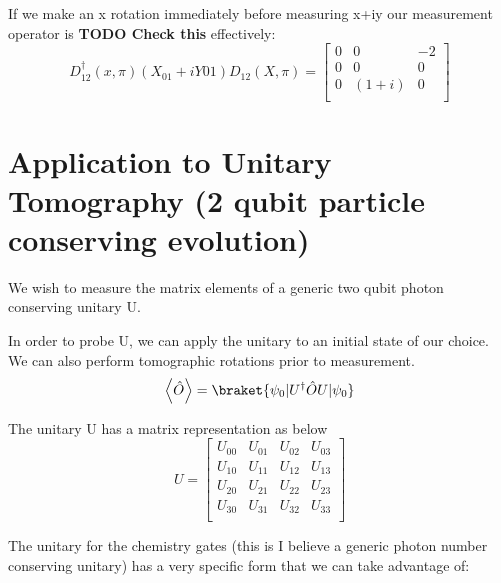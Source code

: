If we make an x rotation immediately before measuring x+iy our measurement operator is \textbf{TODO Check this} effectively:
\begin{equation}
    D_{12}^{\dagger}(x,\pi)(X_{01}+iY{01})D_{12}(X,\pi) =
    \begin{bmatrix}
        0 & 0 & -2 \\
        0 & 0 & 0 \\
        0 & (1+i) & 0 \\
    \end{bmatrix}
\end{equation}


\section{Application to Unitary Tomography (2 qubit particle conserving evolution)}
We wish to measure the matrix elements of a generic two qubit photon conserving unitary U.

In order to probe U, we can apply the unitary to an initial state of our choice.  We can also perform tomographic rotations prior to measurement.
\begin{equation}
    \left< \hat{O} \right> = \braket{\psi_0 | U^{\dagger} \hat{O} U | \psi_0 }
\end{equation}

The unitary U has a matrix representation as below
\begin{equation}
    U =
    \begin{bmatrix}
        U_{00} & U_{01} & U_{02} & U_{03} \\
        U_{10} & U_{11} & U_{12} & U_{13} \\
        U_{20} & U_{21} & U_{22} & U_{23} \\
        U_{30} & U_{31} & U_{32} & U_{33} \\
    \end{bmatrix}
\end{equation}

The unitary for the chemistry gates (this is I believe a generic photon number conserving unitary) has a very specific form that we can take advantage of:

